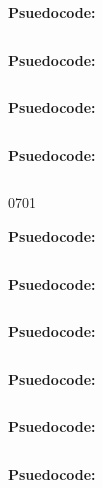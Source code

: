 
\textbf{Psuedocode:}
\begin{verbatim}
\end{verbatim}



\textbf{Psuedocode:}
\begin{verbatim}
\end{verbatim}



\textbf{Psuedocode:}
\begin{verbatim}
\end{verbatim}



\textbf{Psuedocode:}
\begin{verbatim}
\end{verbatim}


  {070}{1}

\textbf{Psuedocode:}
\begin{verbatim}
\end{verbatim}



\textbf{Psuedocode:}
\begin{verbatim}
\end{verbatim}



\textbf{Psuedocode:}
\begin{verbatim}
\end{verbatim}



\textbf{Psuedocode:}
\begin{verbatim}
\end{verbatim}



\textbf{Psuedocode:}
\begin{verbatim}
\end{verbatim}



\textbf{Psuedocode:}
\begin{verbatim}
\end{verbatim}


